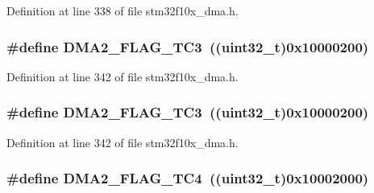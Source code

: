 Definition at line 338 of file stm32f10x\+\_\+dma.\+h.

\subsubsection[{\texorpdfstring{D\+M\+A2\+\_\+\+F\+L\+A\+G\+\_\+\+T\+C3}{DMA2_FLAG_TC3}}]{\setlength{\rightskip}{0pt plus 5cm}\#define D\+M\+A2\+\_\+\+F\+L\+A\+G\+\_\+\+T\+C3~(({\bf uint32\+\_\+t})0x10000200)}\hypertarget{group___d_m_a__flags__definition_ga3b704db8a45d4410509f3552e8b2095f}{}\label{group___d_m_a__flags__definition_ga3b704db8a45d4410509f3552e8b2095f}


Definition at line 342 of file stm32f10x\+\_\+dma.\+h.

\subsubsection[{\texorpdfstring{D\+M\+A2\+\_\+\+F\+L\+A\+G\+\_\+\+T\+C3}{DMA2_FLAG_TC3}}]{\setlength{\rightskip}{0pt plus 5cm}\#define D\+M\+A2\+\_\+\+F\+L\+A\+G\+\_\+\+T\+C3~(({\bf uint32\+\_\+t})0x10000200)}\hypertarget{group___d_m_a__flags__definition_ga3b704db8a45d4410509f3552e8b2095f}{}\label{group___d_m_a__flags__definition_ga3b704db8a45d4410509f3552e8b2095f}


Definition at line 342 of file stm32f10x\+\_\+dma.\+h.

\subsubsection[{\texorpdfstring{D\+M\+A2\+\_\+\+F\+L\+A\+G\+\_\+\+T\+C4}{DMA2_FLAG_TC4}}]{\setlength{\rightskip}{0pt plus 5cm}\#define D\+M\+A2\+\_\+\+F\+L\+A\+G\+\_\+\+T\+C4~(({\bf uint32\+\_\+t})0x10002000)}\hypertarget{group___d_m_a__flags__definition_gad4f76b7a22233dbb9daaad448c431165}{}\label{group___d_m_a__flags__definition_gad4f76b7a22233dbb9daaad448c431165}


